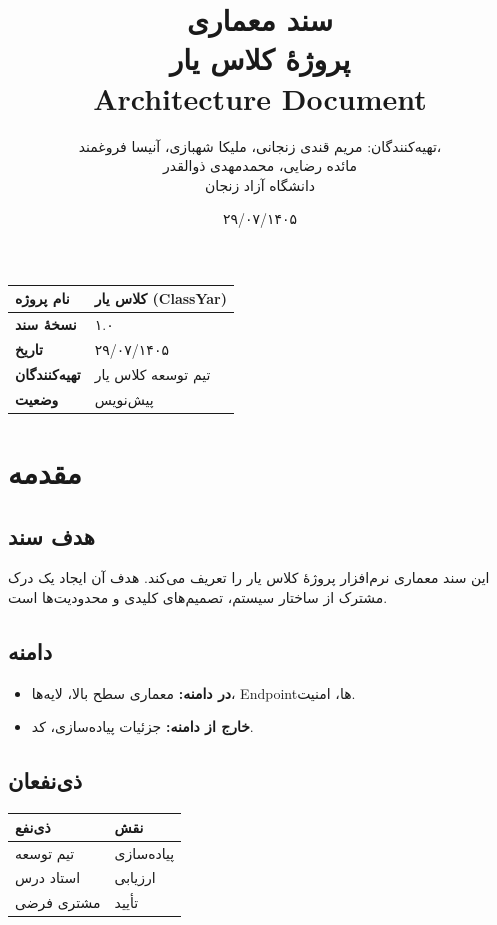 \documentclass[12pt, a4paper]{article}
\title{
    \vspace{-1cm}
    \textbf{\Huge سند معماری}\\[0.3cm]
    \textbf{\LARGE پروژهٔ کلاس یار}\\[0.5cm]
    \large Architecture Document
}
\author{
    تهیه‌کنندگان: مریم قندی زنجانی، ملیکا شهبازی، آنیسا فروغمند،\\
    مائده رضایی، محمدمهدی ذوالقدر\\
    \vspace{0.5cm}
    دانشگاه آزاد زنجان
}
\date{۲۹/۰۷/۱۴۰۵}
\begin{document}
\maketitle
\thispagestyle{empty}

\vspace{1cm}

\begin{center}
\begin{tabular}{|l|l|}
\hline
\textbf{نام پروژه} & کلاس یار (ClassYar) \\
\hline
\textbf{نسخهٔ سند} & ۱.۰ \\
\hline
\textbf{تاریخ} & ۲۹/۰۷/۱۴۰۵ \\
\hline
\textbf{تهیه‌کنندگان} & تیم توسعه کلاس یار \\
\hline
\textbf{وضعیت} & پیش‌نویس \\
\hline
\end{tabular}
\end{center}

\newpage
\tableofcontents
\newpage

\section{مقدمه}

\subsection{هدف سند}
این سند معماری نرم‌افزار پروژهٔ کلاس یار را تعریف می‌کند.
هدف آن ایجاد یک درک مشترک از ساختار سیستم، تصمیم‌های کلیدی و
محدودیت‌ها است.

\subsection{دامنه}
\begin{itemize}
    \item \textbf{در دامنه:} معماری سطح بالا، لایه‌ها، Endpointها، امنیت.
    \item \textbf{خارج از دامنه:} جزئیات پیاده‌سازی، کد.
\end{itemize}

\subsection{ذی‌نفعان}
\begin{center}
\begin{tabular}{|l|l|}
\hline
\textbf{ذی‌نفع} & \textbf{نقش} \\
\hline
تیم توسعه & پیاده‌سازی \\
\hline
استاد درس & ارزیابی \\
\hline
مشتری فرضی & تأیید \\
\hline
\end{tabular}
\end{center}
\end{document}
